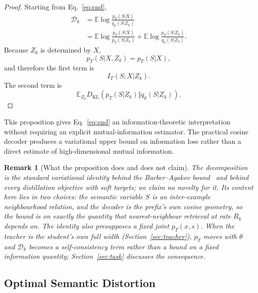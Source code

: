 \documentclass[11pt]{article}
\newtheorem{remark}{Remark}
\newcommand{\KL}{D_{\mathrm{KL}}}
\newcommand{\E}{\mathbb{E}}
\newcommand{\cD}{\mathcal{D}}
\begin{document}
\begin{proof}
Starting from Eq.~\eqref{eq:snd},
\begin{align}
\cD_k
&=
\E
\log
\frac{
    p_T(S|X)
}{
    q_k(S|Z_k)
}
\\
&=
\E
\log
\frac{
    p_T(S|X)
}{
    p_T(S|Z_k)
}
+
\E
\log
\frac{
    p_T(S|Z_k)
}{
    q_k(S|Z_k)
}.
\end{align}
Because $Z_k$ is determined by $X$,
\begin{equation}
    p_T(S|X,Z_k)=p_T(S|X),
\end{equation}
and therefore the first term is
\begin{equation}
    I_T(S;X|Z_k).
\end{equation}
The second term is
\begin{equation}
    \E_{Z_k}
    \KL
    \left(
        p_T(S|Z_k)
        \Vert
        q_k(S|Z_k)
    \right).
\end{equation}
\end{proof}

This proposition gives Eq.~\eqref{eq:snd} an information-theoretic interpretation without requiring an explicit mutual-information estimator.
The practical cosine decoder produces a variational upper bound on information loss rather than a direct estimate of high-dimensional mutual information.

\begin{remark}[What the proposition does and does not claim]
The decomposition is the standard variational identity behind the Barber--Agakov bound~\cite{barber2003algorithm} and behind every distillation objective with soft targets; we claim no novelty for it.
Its content here lies in two choices: the semantic variable $S$ is an \emph{inter-example} neighbourhood relation, and the decoder is the prefix's own cosine geometry, so the bound is on exactly the quantity that nearest-neighbour retrieval at rate $R_k$ depends on.
The identity also presupposes a \emph{fixed} joint $p_T(x,s)$.
When the teacher is the student's own full width (Section~\ref{sec:teacher}), $p_T$ moves with $\theta$ and $\cD_k$ becomes a self-consistency term rather than a bound on a fixed information quantity; Section~\ref{sec:task} discusses the consequence.
\end{remark}


\subsection{Optimal Semantic Distortion}
\label{sec:optimal}
\end{document}
